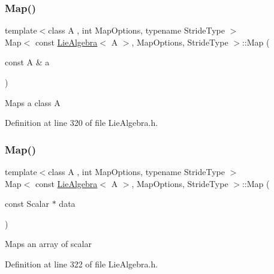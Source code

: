 \subsubsection{\texorpdfstring{Map()}{Map()}\hspace{0.1cm}{\footnotesize\ttfamily [1/3]}}
{\footnotesize\ttfamily template$<$class A , int Map\+Options, typename Stride\+Type $>$ \\
Map$<$ const \hyperlink{class_lie_algebra}{Lie\+Algebra}$<$ A $>$, Map\+Options, Stride\+Type $>$\+::Map (\begin{DoxyParamCaption}\item[{const A \&}]{a }\end{DoxyParamCaption})\hspace{0.3cm}{\ttfamily [inline]}}

Maps a class A 

Definition at line 320 of file Lie\+Algebra.\+h.

\hypertarget{class_map_3_01const_01_lie_algebra_3_01_a_01_4_00_01_map_options_00_01_stride_type_01_4_a7f5161e409b77fad4e7345c82692c801}{}\label{class_map_3_01const_01_lie_algebra_3_01_a_01_4_00_01_map_options_00_01_stride_type_01_4_a7f5161e409b77fad4e7345c82692c801} 
\subsubsection{\texorpdfstring{Map()}{Map()}\hspace{0.1cm}{\footnotesize\ttfamily [2/3]}}
{\footnotesize\ttfamily template$<$class A , int Map\+Options, typename Stride\+Type $>$ \\
Map$<$ const \hyperlink{class_lie_algebra}{Lie\+Algebra}$<$ A $>$, Map\+Options, Stride\+Type $>$\+::Map (\begin{DoxyParamCaption}\item[{const Scalar $\ast$}]{data }\end{DoxyParamCaption})\hspace{0.3cm}{\ttfamily [inline]}}

Maps an array of scalar 

Definition at line 322 of file Lie\+Algebra.\+h.

\hypertarget{class_map_3_01const_01_lie_algebra_3_01_a_01_4_00_01_map_options_00_01_stride_type_01_4_aa1bcc912b7d596a67e3fedd49c0a7d75}{}\label{class_map_3_01const_01_lie_algebra_3_01_a_01_4_00_01_map_options_00_01_stride_type_01_4_aa1bcc912b7d596a67e3fedd49c0a7d75} 
